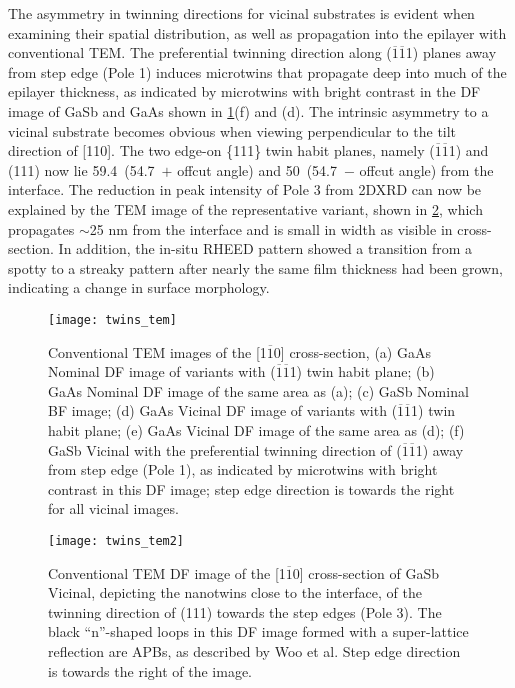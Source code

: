 The asymmetry in twinning directions for vicinal substrates is evident when examining their spatial distribution, as well as propagation into the epilayer with conventional TEM\@. The preferential twinning direction along
(\(\overline{1}\overline{1}\)1)
planes away from step edge (Pole 1) induces microtwins that propagate deep into much of the epilayer thickness, as indicated by microtwins with bright contrast in the DF image of GaSb and GaAs shown in \cref{fig:twins_tem}(f) and (d).
The intrinsic asymmetry to a vicinal substrate becomes obvious when viewing perpendicular to the tilt direction of [110].
The two edge-on \{111\} twin habit planes, namely
(\(\overline{1}\overline{1}\)1)
and (111) now lie 59.4\degree~(54.7\degree~\(+\) offcut angle) and 50\degree~(54.7\degree~\(-\) offcut angle) from the interface.
The reduction in peak intensity of Pole 3 from 2DXRD can now be explained by the TEM image of the representative variant, shown in \cref{fig:twins_tem2}, which propagates \(\sim\)25 nm from the interface and is small in width as visible in cross-section.
In addition, the in-situ RHEED pattern showed a transition from a spotty to a streaky pattern after nearly the same film thickness had been grown, indicating a change in surface morphology.
\begin{figure}
 \centering \texttt{[image: twins\_tem]}
 \caption[TEM images of III-V on silicon]{\label{fig:twins_tem}Conventional TEM images of the [1\(\overline{1}\)0] cross-section, (a) GaAs Nominal DF image of variants with
  (\(\overline{1}\overline{1}\)1)
  twin habit plane; (b) GaAs Nominal DF image of the same area as (a); (c) GaSb Nominal BF image; (d) GaAs Vicinal DF image of variants with
  (\(\overline{1}\overline{1}\)1)
  twin habit plane; (e) GaAs Vicinal DF image of the same area as (d); (f) GaSb Vicinal with the preferential twinning direction of
  (\(\overline{1}\overline{1}\)1)
  away from step edge (Pole 1), as indicated by microtwins with bright contrast in this DF image; step edge direction is towards the right for all vicinal images.}
\end{figure}
\begin{figure}
 \centering \texttt{[image: twins\_tem2]}
 \caption[TEM of GaSb on silicon]{\label{fig:twins_tem2}Conventional TEM DF image of the [1\(\overline{1}\)0] cross-section of GaSb Vicinal, depicting the nanotwins close to the interface, of the twinning direction of (111) towards the step edges (Pole 3).
  The black ``n''-shaped loops in this DF image formed with a super-lattice reflection are APBs, as described by Woo et al.\cite{Woo}
  Step edge direction is towards the right of the image.}
\end{figure}
